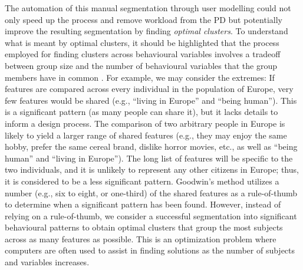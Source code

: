 The automation of this manual segmentation through user modelling could not only speed up the process and remove workload from the PD but potentially improve the resulting segmentation by finding \textit{optimal clusters}. To understand what is meant by optimal clusters, it should be highlighted that the process employed for finding clusters across behavioural variables involves a tradeoff between group size and the number of behavioural variables that the group members have in common \citep{Chapman2008}. For example, we may consider the extremes: If features are compared across every individual in the population of Europe, very few features would be shared (e.g., ``living in Europe'' and ``being human''). This is a significant pattern (as many people can share it), but it lacks details to inform a design process. The comparison of two arbitrary people in Europe is likely to yield a larger range of shared features (e.g., they may enjoy the same hobby, prefer the same cereal brand, dislike horror movies, etc., as well as ``being human'' and ``living in Europe''). The long list of features will be specific to the two individuals, and it is unlikely to represent any other citizens in Europe; thus, it is considered to be a less significant pattern. Goodwin's method utilizes a number (e.g., six to eight, or one-third) of the shared features as a rule-of-thumb to determine when a significant pattern has been found. However, instead of relying on a rule-of-thumb, we consider a successful segmentation into significant behavioural patterns to obtain optimal clusters that group the most subjects across as many features as possible. This is an optimization problem where computers are often used to assist in finding solutions as the number of subjects and variables increases. 


